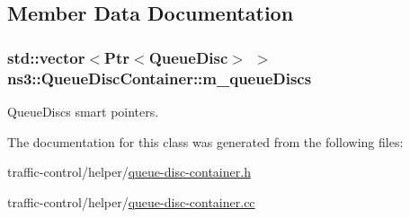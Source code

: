 \subsection{Member Data Documentation}
\subsubsection[{\texorpdfstring{m\+\_\+queue\+Discs}{m_queueDiscs}}]{\setlength{\rightskip}{0pt plus 5cm}std\+::vector$<${\bf Ptr}$<${\bf Queue\+Disc}$>$ $>$ ns3\+::\+Queue\+Disc\+Container\+::m\+\_\+queue\+Discs\hspace{0.3cm}{\ttfamily [private]}}\hypertarget{classns3_1_1QueueDiscContainer_a1518c7ab608bf21b84b21474131ffed5}{}\label{classns3_1_1QueueDiscContainer_a1518c7ab608bf21b84b21474131ffed5}


Queue\+Discs smart pointers. 



The documentation for this class was generated from the following files\+:\begin{DoxyCompactItemize}
\item 
traffic-\/control/helper/\hyperlink{queue-disc-container_8h}{queue-\/disc-\/container.\+h}\item 
traffic-\/control/helper/\hyperlink{queue-disc-container_8cc}{queue-\/disc-\/container.\+cc}\end{DoxyCompactItemize}
